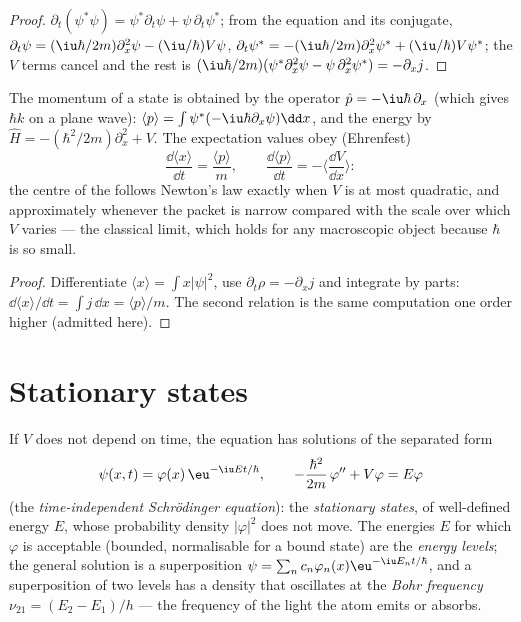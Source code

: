 \begin{proof}
$\partial_t(\psi^*\psi) = \psi^*\partial_t\psi + \psi\,\partial_t\psi^*$; from the
equation and its conjugate, $\partial_t\psi = (\iu\hbar/2m)\partial_x^2\psi -
(\iu/\hbar)V\psi$, $\partial_t\psi^* = -(\iu\hbar/2m)\partial_x^2\psi^* +
(\iu/\hbar)V\psi^*$; the $V$ terms cancel and the rest is $(\iu\hbar/2m)(\psi^*
\partial_x^2\psi - \psi\,\partial_x^2\psi^*) = -\partial_xj$.
\end{proof}

\begin{proposition}\label{prop:b2:schrodinger-wave-functions:ehrenfest}
The momentum of a state is obtained by the operator $\hat p =
-\iu\hbar\,\partial_x$ (which gives $\hbar k$ on a plane wave): $\langle
p\rangle = \int\psi^*(-\iu\hbar\partial_x\psi)\dd x$, and the energy by $\hat H
= -(\hbar^2/2m)\partial_x^2 + V$. The expectation values obey
(Ehrenfest)
\[
\frac{\dd\langle x\rangle}{\dd t} = \frac{\langle p\rangle}{m}, \qquad
\frac{\dd\langle p\rangle}{\dd t} = -\Big\langle\frac{\dd V}{\dd x}\Big\rangle :
\]
the centre of the  follows Newton's law exactly when $V$ is
at most quadratic, and approximately whenever the packet is narrow
compared with the scale over which $V$ varies --- the classical limit,
which holds for any macroscopic object because $\hbar$ is so small.
\end{proposition}

\begin{proof}
Differentiate $\langle x\rangle = \int x|\psi|^2$, use $\partial_t\rho =
-\partial_xj$ and integrate by parts: $\dd\langle x\rangle/\dd t = \int j\,\dd x
= \langle p\rangle/m$. The second relation is the same computation one
order higher (admitted here).
\end{proof}

\section{Stationary states}

\begin{theorem}\label{thm:b2:schrodinger-wave-functions:stationary}
If $V$ does not depend on time, the equation has solutions of the
separated form
\[
\psi(x,t) = \varphi(x)\,\eu^{-\iu Et/\hbar}, \qquad
-\frac{\hbar^2}{2m}\,\varphi'' + V\varphi = E\varphi
\]
(the \emph{time-independent Schrödinger equation}): the \emph{stationary states}, of well-defined energy $E$, whose probability density
$|\varphi|^2$ does not move. The energies $E$ for which $\varphi$ is
acceptable (bounded, normalisable for a bound state) are the
\emph{energy levels}; the general solution is a superposition $\psi =
\sum_nc_n\varphi_n(x)\eu^{-\iu E_nt/\hbar}$, and a superposition of two levels
has a density that oscillates at the \emph{Bohr frequency} $\nu_{21} = (E_2 - E_1)/h$ --- the frequency of the light the
atom emits or absorbs.
\end{theorem}

